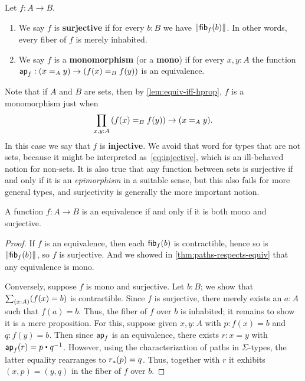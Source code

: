 \begin{defn}
  Let $f:A\to B$.
  \begin{enumerate}
  \item We say $f$ is \textbf{surjective} if for every $b:B$ we have $\brck{\hfib f b}$.
    In other words, every fiber of $f$ is merely inhabited.
  \item We say $f$ is a \textbf{monomorphism} (or a \textbf{mono}) if for every $x,y:A$ the function $\apfunc f : (\id[A]xy) \to (\id[B]{f(x)}{f(y)})$ is an equivalence.
  \end{enumerate}
\end{defn}

Note that if $A$ and $B$ are sets, then by \autoref{lem:equiv-iff-hprop}, $f$ is a monomorphism just when
\begin{equation}
  \prd{x,y:A} (\id[B]{f(x)}{f(y)}) \to (\id[A]xy).\label{eq:injective}
\end{equation}
In this case we say that $f$ is \textbf{injective}.
We avoid that word for types that are not sets, because it might be interpreted as~\eqref{eq:injective}, which is an ill-behaved notion for non-sets.
It is also true that any function between sets is surjective if and only if it is an \emph{epimorphism} in a suitable sense, but this also fails for more general types, and surjectivity is generally the more important notion.

\begin{thm}\label{thm:mono-surj-equiv}
  A function $f:A\to B$ is an equivalence if and only if it is both mono and surjective.
\end{thm}
\begin{proof}
  If $f$ is an equivalence, then each $\hfib f b$ is contractible, hence so is $\brck{\hfib f b}$, so $f$ is surjective.
  And we showed in \autoref{thm:paths-respects-equiv} that any equivalence is mono.

  Conversely, suppose $f$ is mono and surjective.
  Let $b:B$; we show that $\sm{x:A}(f(x)=b)$ is contractible.
  Since $f$ is surjective, there merely exists an $a:A$ such that $f(a)=b$.
  Thus, the fiber of $f$ over $b$ is inhabited; it remains to show it is a mere proposition.
  For this, suppose given $x,y:A$ with $p:f(x)=b$ and $q:f(y)=b$.
  Then since $\apfunc f$ is an equivalence, there exists $r:x=y$ with $\apfunc f (r) = p \ct \opp q$.
  However, using the characterization of paths in $\Sigma$-types, the latter equality rearranges to $\trans{r}{p} = q$.
  Thus, together with $r$ it exhibits $(x,p) = (y,q)$ in the fiber of $f$ over $b$.
\end{proof}

